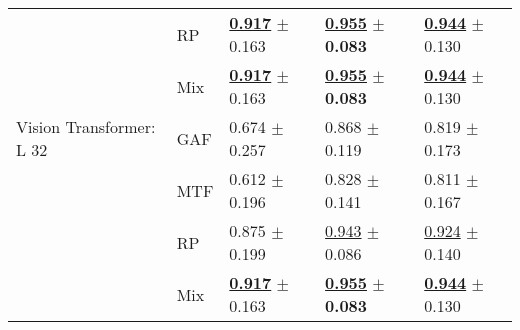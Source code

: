 \begin{tabular}{lllll}
 & RP & \underline{\textbf{\textcolor[rgb]{0.0000000000,0.5000000000,0}{0.917}}} $\pm$ \textcolor[rgb]{0.6327066559,0.3672933441,0}{0.163} & \underline{\textbf{\textcolor[rgb]{0.0000000000,0.5000000000,0}{0.955}}} $\pm$ \textbf{\textcolor[rgb]{0.0000000000,0.5000000000,0}{0.083}} & \underline{\textbf{\textcolor[rgb]{0.0000000000,0.5000000000,0}{0.944}}} $\pm$ \textcolor[rgb]{0.0065585724,0.5000000000,0}{0.130} \\
 & Mix & \underline{\textbf{\textcolor[rgb]{0.0000000000,0.5000000000,0}{0.917}}} $\pm$ \textcolor[rgb]{0.6327066559,0.3672933441,0}{0.163} & \underline{\textbf{\textcolor[rgb]{0.0000000000,0.5000000000,0}{0.955}}} $\pm$ \textbf{\textcolor[rgb]{0.0000000000,0.5000000000,0}{0.083}} & \underline{\textbf{\textcolor[rgb]{0.0000000000,0.5000000000,0}{0.944}}} $\pm$ \textcolor[rgb]{0.0065585724,0.5000000000,0}{0.130} \\
Vision Transformer: L 32 & GAF & \textcolor[rgb]{0.5531609195,0.4468390805,0}{0.674} $\pm$ \textcolor[rgb]{1.0000000000,0.0000000000,0}{0.257} & \textcolor[rgb]{0.5561224490,0.4438775510,0}{0.868} $\pm$ \textcolor[rgb]{0.5062177735,0.4937822265,0}{0.119} & \textcolor[rgb]{0.5294117647,0.4705882353,0}{0.819} $\pm$ \textcolor[rgb]{0.2883381018,0.5000000000,0}{0.173} \\
 & MTF & \textcolor[rgb]{0.6922413793,0.3077586207,0}{0.612} $\pm$ \textcolor[rgb]{0.7598126938,0.2401873062,0}{0.196} & \textcolor[rgb]{0.8140074212,0.1859925788,0}{0.828} $\pm$ \textcolor[rgb]{0.8133655464,0.1866344536,0}{0.141} & \textcolor[rgb]{0.5668449198,0.4331550802,0}{0.811} $\pm$ \textcolor[rgb]{0.2469167869,0.5000000000,0}{0.167} \\
 & RP & \textcolor[rgb]{0.0948275862,0.5000000000,0}{0.875} $\pm$ \textcolor[rgb]{0.7749042320,0.2250957680,0}{0.199} & \underline{\textcolor[rgb]{0.0765306122,0.5000000000,0}{0.943}} $\pm$ \textcolor[rgb]{0.0436410935,0.5000000000,0}{0.086} & \underline{\textcolor[rgb]{0.0882352941,0.5000000000,0}{0.924}} $\pm$ \textcolor[rgb]{0.0707312682,0.5000000000,0}{0.140} \\
 & Mix & \underline{\textbf{\textcolor[rgb]{0.0000000000,0.5000000000,0}{0.917}}} $\pm$ \textcolor[rgb]{0.6327066559,0.3672933441,0}{0.163} & \underline{\textbf{\textcolor[rgb]{0.0000000000,0.5000000000,0}{0.955}}} $\pm$ \textbf{\textcolor[rgb]{0.0000000000,0.5000000000,0}{0.083}} & \underline{\textbf{\textcolor[rgb]{0.0000000000,0.5000000000,0}{0.944}}} $\pm$ \textcolor[rgb]{0.0065585724,0.5000000000,0}{0.130} \\
\bottomrule
\end{tabular}

